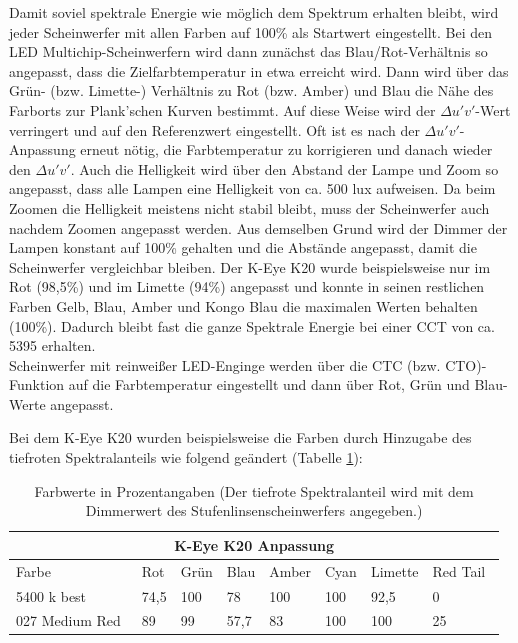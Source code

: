 Damit soviel spektrale Energie wie möglich dem Spektrum erhalten bleibt, wird jeder Scheinwerfer mit allen Farben auf 100\% als Startwert eingestellt. Bei den LED Multichip-Scheinwerfern wird dann zunächst das Blau/Rot-Verhältnis so angepasst, dass die Zielfarbtemperatur in etwa erreicht wird. Dann wird über das Grün- (bzw. Limette-) Verhältnis  zu Rot (bzw. Amber) und Blau die Nähe des Farborts zur Plank'schen Kurven bestimmt. Auf diese Weise wird der $\Delta u'v'$-Wert verringert und auf den Referenzwert eingestellt. Oft ist es nach der $\Delta u'v'$-Anpassung erneut nötig, die Farbtemperatur zu korrigieren und danach wieder den $\Delta u'v'$. Auch die Helligkeit wird über den Abstand der Lampe und Zoom so angepasst, dass alle Lampen eine Helligkeit von ca. 500 lux aufweisen. Da beim Zoomen die Helligkeit meistens nicht stabil bleibt, muss der Scheinwerfer auch nachdem Zoomen angepasst werden. Aus demselben Grund wird der Dimmer der Lampen konstant auf 100\% gehalten und die Abstände angepasst, damit die Scheinwerfer vergleichbar bleiben. Der K-Eye K20 wurde beispielsweise nur im Rot (98,5\%) und im Limette (94\%) angepasst und konnte in seinen restlichen Farben Gelb, Blau, Amber und Kongo Blau die maximalen Werten behalten (100\%). Dadurch bleibt fast die ganze Spektrale Energie bei einer CCT von ca. 5395 erhalten.\\
Scheinwerfer mit reinweißer LED-Enginge werden über die CTC (bzw. CTO)-Funktion auf die Farbtemperatur eingestellt und dann über Rot, Grün und Blau-Werte angepasst. 

Bei dem K-Eye K20 wurden beispielsweise die Farben durch Hinzugabe des tiefroten Spektralanteils wie folgend geändert (Tabelle \ref{t_drehen}):

\begin{table}[htp] 
		\centering
		\begin{tabular}{llllllll}  %
		\toprule
		\multicolumn{8}{c}{\large\sffamily K-Eye K20 Anpassung}\\ 							
		\midrule
		Farbe & Rot & Grün & Blau & Amber & Cyan & Limette &  \glqq Red Tail\grqq\ \\
		 5400 k best & 74,5 & 100 & 78 & 100 & 100 & 92,5 & 0\\
		027 \glqq Medium Red\grqq\ & 89 & 99 & 57,7 & 83 & 100 & 100 & 25\\
		\bottomrule
		\end{tabular}
		\caption{Farbwerte in Prozentangaben (Der tiefrote Spektralanteil wird mit dem Dimmerwert des Stufenlinsenscheinwerfers angegeben.)}	
		\label{t_drehen}
	\end{table}
	
